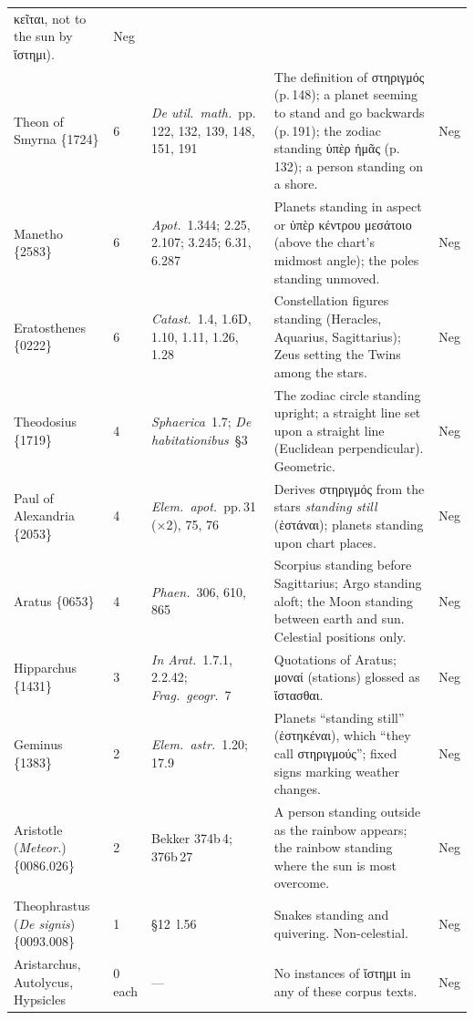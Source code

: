 \documentclass[11pt,a4paper]{article}
\newcommand{\grk}[1]{{\fontencoding{LGR}\selectfont #1}}
\newcommand{\grk}[1]{{\greekfont #1}}
\begin{document}
\begin{longtable}{@{}p{3.2cm}p{1.0cm}p{4.2cm}p{4.2cm}p{0.7cm}@{}}
  \grk{κεῖται}, not to the sun by \grk{ἵστημι}). & Neg \\[3pt]
Theon of Smyrna \{1724\} & 6 &
  \textit{De util.\ math.}~pp.\,122, 132, 139, 148, 151, 191 &
  The definition of \grk{στηριγμός} (p.\,148); a planet seeming to stand
  and go backwards (p.\,191); the zodiac standing \grk{ὑπὲρ ἡμᾶς}
  (p.\,132); a person standing on a shore. & Neg \\[3pt]
Manetho \{2583\} & 6 &
  \textit{Apot.}~1.344; 2.25, 2.107; 3.245; 6.31, 6.287 &
  Planets standing in aspect or \grk{ὑπὲρ κέντρου μεσάτοιο} (above the
  chart's midmost angle); the poles standing unmoved. & Neg \\[3pt]
Eratosthenes \{0222\} & 6 &
  \textit{Catast.}~1.4, 1.6D, 1.10, 1.11, 1.26, 1.28 &
  Constellation figures standing (Heracles, Aquarius, Sagittarius); Zeus
  setting the Twins among the stars. & Neg \\[3pt]
Theodosius \{1719\} & 4 &
  \textit{Sphaerica}~1.7; \textit{De habitationibus}~§3 &
  The zodiac circle standing upright; a straight line set upon a straight
  line (Euclidean perpendicular). Geometric. & Neg \\[3pt]
Paul of Alexandria \{2053\} & 4 &
  \textit{Elem.\ apot.}~pp.\,31 ($\times$2), 75, 76 &
  Derives \grk{στηριγμός} from the stars \emph{standing still}
  (\grk{ἑστάναι}); planets standing upon chart places. & Neg \\[3pt]
Aratus \{0653\} & 4 &
  \textit{Phaen.}~306, 610, 865 &
  Scorpius standing before Sagittarius; Argo standing aloft; the Moon
  standing between earth and sun. Celestial positions only. & Neg \\[3pt]
Hipparchus \{1431\} & 3 &
  \textit{In Arat.}~1.7.1, 2.2.42; \textit{Frag.\ geogr.}~7 &
  Quotations of Aratus; \grk{μοναί} (stations) glossed as
  \grk{ἵστασθαι}. & Neg \\[3pt]
Geminus \{1383\} & 2 &
  \textit{Elem.\ astr.}~1.20; 17.9 &
  Planets ``standing still'' (\grk{ἑστηκέναι}), which ``they call
  \grk{στηριγμούς}''; fixed signs marking weather changes. & Neg \\[3pt]
Aristotle (\textit{Meteor.}) \{0086.026\} & 2 &
  Bekker 374b\,4; 376b\,27 &
  A person standing outside as the rainbow appears; the rainbow standing
  where the sun is most overcome. & Neg \\[3pt]
Theophrastus (\textit{De signis}) \{0093.008\} & 1 &
  §12~l.56 &
  Snakes standing and quivering. Non-celestial. & Neg \\[3pt]
Aristarchus, Autolycus,
  Hypsicles & 0 each &
  --- & No instances of \grk{ἵστημι} in any of these corpus texts. & Neg \\[6pt]


\end{longtable}
\end{document}
